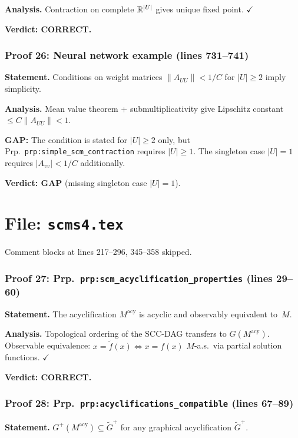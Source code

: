 \documentclass{article}
\begin{document}
\textbf{Analysis.} Contraction on complete $\mathbb{R}^{|U|}$ gives unique fixed point.
$\checkmark$

\textbf{Verdict: CORRECT.}

\section{Proof 26: Neural network example (lines 731--741)}
\textbf{Statement.} Conditions on weight matrices $\|A_{UU}\|<1/C$ for
$|U|\ge 2$ imply simplicity.

\textbf{Analysis.} Mean value theorem + submultiplicativity give Lipschitz
constant $\le C\|A_{UU}\|<1$.

\textbf{GAP:} The condition is stated for $|U|\ge 2$ only, but
Prp.~\texttt{prp:simple\_scm\_contraction} requires $|U|\ge 1$.
The singleton case $|U|=1$ requires $|A_{vv}|<1/C$ additionally.

\textbf{Verdict: GAP} (missing singleton case $|U|=1$).

\part*{File: \texttt{scms4.tex}}

Comment blocks at lines 217--296, 345--358 skipped.

\section{Proof 27: Prp.\ \texttt{prp:scm\_acyclification\_properties}
(lines 29--60)}
\textbf{Statement.} The acyclification $M^{\mathrm{acy}}$ is acyclic and
observably equivalent to~$M$.

\textbf{Analysis.} Topological ordering of the SCC-DAG transfers to
$G(M^{\mathrm{acy}})$.  Observable equivalence: $x=\tilde f(x)\iff x=f(x)$
$M$-a.s.\ via partial solution functions.  $\checkmark$

\textbf{Verdict: CORRECT.}

\section{Proof 28: Prp.\ \texttt{prp:acyclifications\_compatible}
(lines 67--89)}
\textbf{Statement.} $G^+(M^{\mathrm{acy}})\subseteq\tilde G^+$ for any
graphical acyclification $\tilde G^+$.
\end{document}

